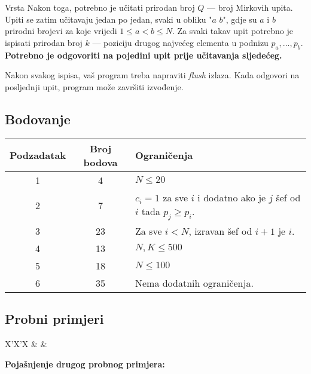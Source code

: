 \begin{statement}[
  problempoints=100,
  timelimit=1 sekunda,
  memorylimit=512 MiB,
]{Vrsta}
Nakon toga, potrebno je učitati prirodan broj $Q$ — broj Mirkovih upita. Upiti se zatim učitavaju jedan po jedan, svaki u obliku "$a$ $b$", gdje su $a$ i $b$ prirodni brojevi za koje vrijedi $1 \le a < b \le N$. Za svaki takav upit potrebno je ispisati prirodan broj $k$ — poziciju drugog najvećeg elementa u podnizu $p_a, \ldots, p_b$. \textbf{Potrebno je odgovoriti na pojedini upit prije učitavanja sljedećeg.}

Nakon svakog ispisa, vaš program treba napraviti \textit{flush} izlaza. Kada odgovori na posljednji upit, program može završiti izvođenje.

\subsection*{Bodovanje}


{\renewcommand{\arraystretch}{1.4}
  \setlength{\tabcolsep}{6pt}
  \begin{tabular}{ccl}
   Podzadatak & Broj bodova & Ograničenja \\ \midrule
   	1 & 4 & $N \leq 20$ \\
    2 & 7 & $c_i = 1$ za sve $i$ i dodatno ako je $j$ šef od $i$ tada $p_j \geq p_i$. \\
    3 & 23 & Za sve $i < N$, izravan šef od $i + 1$ je $i$. \\
    4 & 13 & $N, K \leq 500$ \\
    5 & 18 & $N \leq 100$ \\
    6 & 35 & Nema dodatnih ograničenja. \\
\end{tabular}}

\subsection*{Probni primjeri}
\begin{tabularx}{\textwidth}{X'X'X}
 &
 &
\end{tabularx}

\textbf{Pojašnjenje drugog probnog primjera:}\\


\end{statement}

